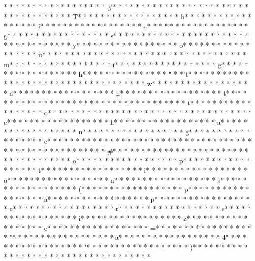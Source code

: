 * * *  * * *  * * *  *  * * *  *  * * *  * #* * *  * * *  * * *  *  * * *  *  * * *  *  * * *  * * *  * * *  *  * * *  *  * * *  * T* * *  * * *  * * *  *  * * *  *  * * *  * h* * *  * * *  * * *  *  * * *  *  * * *  * i* * *  * * *  * * *  *  * * *  *  * * *  * n* * *  * * *  * * *  *  * * *  *  * * *  * g* * *  * * *  * * *  *  * * *  *  * * *  * s* * *  * * *  * * *  *  * * *  *  * * *  *  * * *  * * *  * * *  *  * * *  *  * * *  * y* * *  * * *  * * *  *  * * *  *  * * *  * o* * *  * * *  * * *  *  * * *  *  * * *  * u* * *  * * *  * * *  *  * * *  *  * * *  *  * * *  * * *  * * *  *  * * *  *  * * *  * m* * *  * * *  * * *  *  * * *  *  * * *  * i* * *  * * *  * * *  *  * * *  *  * * *  * g* * *  * * *  * * *  *  * * *  *  * * *  * h* * *  * * *  * * *  *  * * *  *  * * *  * t* * *  * * *  * * *  *  * * *  *  * * *  *  * * *  * * *  * * *  *  * * *  *  * * *  * w* * *  * * *  * * *  *  * * *  *  * * *  * a* * *  * * *  * * *  *  * * *  *  * * *  * n* * *  * * *  * * *  *  * * *  *  * * *  * t* * *  * * *  * * *  *  * * *  *  * * *  *  * * *  * * *  * * *  *  * * *  *  * * *  * t* * *  * * *  * * *  *  * * *  *  * * *  * o* * *  * * *  * * *  *  * * *  *  * * *  *  * * *  * * *  * * *  *  * * *  *  * * *  * c* * *  * * *  * * *  *  * * *  *  * * *  * h* * *  * * *  * * *  *  * * *  *  * * *  * a* * *  * * *  * * *  *  * * *  *  * * *  * n* * *  * * *  * * *  *  * * *  *  * * *  * g* * *  * * *  * * *  *  * * *  *  * * *  * e* * *  * * *  * * *  *  * * *  *  * * *  * 
* * *  * * *  * * *  *  * * *  *  * * *  *  * * *  * * *  * * *  *  * * *  *  * * *  * #* * *  * * *  * * *  *  * * *  *  * * *  *  * * *  * * *  * * *  *  * * *  *  * * *  * o* * *  * * *  * * *  *  * * *  *  * * *  * p* * *  * * *  * * *  *  * * *  *  * * *  * t* * *  * * *  * * *  *  * * *  *  * * *  * i* * *  * * *  * * *  *  * * *  *  * * *  * o* * *  * * *  * * *  *  * * *  *  * * *  * n* * *  * * *  * * *  *  * * *  *  * * *  * s* * *  * * *  * * *  *  * * *  *  * * *  * (* * *  * * *  * * *  *  * * *  *  * * *  * p* * *  * * *  * * *  *  * * *  *  * * *  * a* * *  * * *  * * *  *  * * *  *  * * *  * p* * *  * * *  * * *  *  * * *  *  * * *  * e* * *  * * *  * * *  *  * * *  *  * * *  * r* * *  * * *  * * *  *  * * *  *  * * *  * s* * *  * * *  * * *  *  * * *  *  * * *  * i* * *  * * *  * * *  *  * * *  *  * * *  * z* * *  * * *  * * *  *  * * *  *  * * *  * e* * *  * * *  * * *  *  * * *  *  * * *  * =* * *  * * *  * * *  *  * * *  *  * * *  * "* * *  * * *  * * *  *  * * *  *  * * *  * a* * *  * * *  * * *  *  * * *  *  * * *  * 4* * *  * * *  * * *  *  * * *  *  * * *  * "* * *  * * *  * * *  *  * * *  *  * * *  * )* * *  * * *  * * *  *  * * *  *  * * *  *  * * *  * * *  * * *  *  * * *  *  * * *  * 
